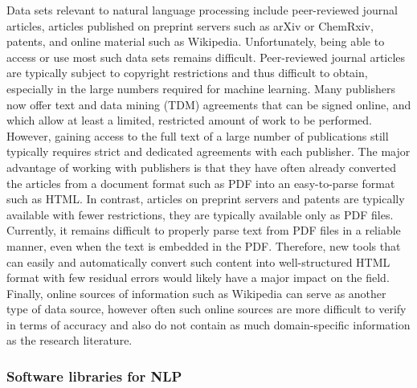 \documentclass[pdflatex,sn-mathphys]{sn-jnl}%
\theoremstyle{thmstyleone}%
\theoremstyle{thmstyletwo}%
\theoremstyle{thmstylethree}%
\begin{document}
Data sets relevant to natural language processing include peer-reviewed journal articles, articles published on preprint servers such as arXiv or ChemRxiv, patents, and online material such as Wikipedia. Unfortunately, being able to access or use most such data sets remains difficult. Peer-reviewed journal articles are typically subject to copyright restrictions and thus difficult to obtain, especially in the large numbers required for machine learning. Many publishers now offer text and data mining (TDM) agreements that can be signed online, and which allow at least a limited, restricted amount of work to be performed. However, gaining access to the full text of a large number of publications still typically requires strict and dedicated agreements with each publisher. The major advantage of working with publishers is that they have often already converted the articles from a document format such as PDF into an easy-to-parse format such as HTML. In contrast, articles on preprint servers and patents are typically available with fewer restrictions, they are typically available only as PDF files. Currently, it remains difficult to properly parse text from PDF files in a reliable manner, even when the text is embedded in the PDF. Therefore, new tools that can easily and automatically convert such content into well-structured HTML format with few residual errors would likely have a major impact on the field. Finally, online sources of information such as Wikipedia can serve as another type of data source, however often such online sources are more difficult to verify in terms of accuracy and also do not contain as much domain-specific information as the research literature.


\subsubsection{Software libraries for NLP}
\end{document}
